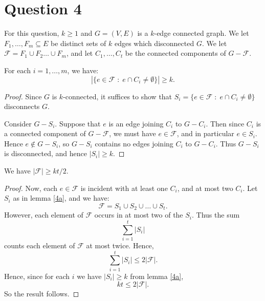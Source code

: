 \documentclass{unswmaths}
\begin{document}
\section*{Question 4}
For this question, $k \geq 1$ and $G = (V,E)$ is a $k$-edge connected
graph. We let $F_1,\ldots,F_m \subseteq E$ be distinct sets of $k$ edges
which disconnected $G$. We let $\mathcal{F} = F_1\cup F_2\ldots \cup F_m$,
and let $C_1,\ldots,C_t$ be the connected components of $G-\mathcal{F}$.

\begin{lemma}[Part (a)]
\label{4a}
    For each $i = 1,\ldots,m$, we have:
    \begin{equation*}
        |\{e \in \mathcal{F}\;:\;e \cap C_i \neq \emptyset\}| \geq k.
    \end{equation*}
\end{lemma}
\begin{proof}
    Since $G$ is $k$-connected, it suffices to show that $S_i = \{e \in \mathcal{F}\;:\;e \cap C_i \neq \emptyset\}$
    disconnects $G$. 
    
    Consider $G-S_i$. Suppose that $e$ is an edge joining $C_i$ to $G-C_i$. Then
    since $C_i$ is a connected component of $G-\mathcal{F}$, we must have $e \in \mathcal{F}$,
    and in particular $e \in S_i$. Hence $e \notin G-S_i$, so $G-S_i$
    contains no edges joining $C_i$ to $G-C_i$. Thus $G-S_i$ is disconnected, 
    and hence $|S_i| \geq k$.
\end{proof}

\begin{corollary}[Part (b)]
    We have $|\mathcal{F}| \geq kt/2$.
\end{corollary}
\begin{proof}
    Now, each $e \in \mathcal{F}$ is incident with at least one $C_i$, and at
    most two $C_i$. Let $S_i$ as in lemma \ref{4a}, and we have:
    \begin{equation*}
        \mathcal{F} = S_1\cup S_2\cup \ldots \cup S_t. 
    \end{equation*}
    However, each element of $\mathcal{F}$ occurs in at most two of the $S_i$. 
    Thus the sum
    \begin{equation*}
       \sum_{i=1}^t |S_i|
    \end{equation*}
    counts each element of $\mathcal{F}$ at most twice. Hence,
    \begin{equation*}
        \sum_{i=1}^t |S_i| \leq 2|\mathcal{F}|.
    \end{equation*}
    Hence, since for each $i$ we have $|S_i| \geq k$ from lemma \ref{4a}, 
    \begin{equation*}
        kt \leq 2|\mathcal{F}|.
    \end{equation*}
    So the result follows.
\end{proof}
\end{document}
